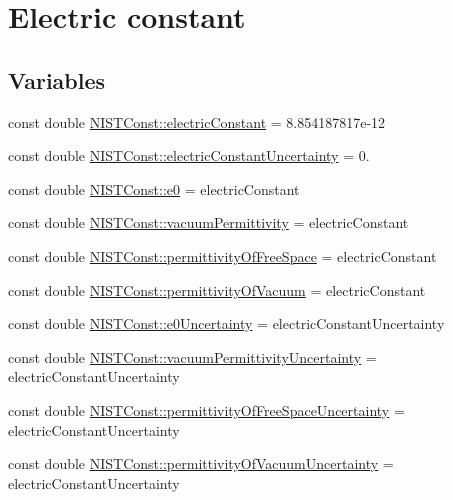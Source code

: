 \hypertarget{group___n_i_s_t_const-_electric_constant}{}\section{Electric constant}
\label{group___n_i_s_t_const-_electric_constant}
\subsection*{Variables}
\begin{DoxyCompactItemize}
\item 
const double \hyperlink{group___n_i_s_t_const-_electric_constant_gae5a425228125285727dd53333725ef76}{N\+I\+S\+T\+Const\+::electric\+Constant} = 8.\+854187817e-\/12
\item 
const double \hyperlink{group___n_i_s_t_const-_electric_constant_gaf65e89a9fe674a6f80f5a66bbe101aab}{N\+I\+S\+T\+Const\+::electric\+Constant\+Uncertainty} = 0.
\item 
const double \hyperlink{group___n_i_s_t_const-_electric_constant_ga6fa2aaf171b8dafe96bbd87c7aa95f59}{N\+I\+S\+T\+Const\+::e0} = electric\+Constant
\item 
const double \hyperlink{group___n_i_s_t_const-_electric_constant_ga46294f940b4149602e7bef336431c7dd}{N\+I\+S\+T\+Const\+::vacuum\+Permittivity} = electric\+Constant
\item 
const double \hyperlink{group___n_i_s_t_const-_electric_constant_ga56d0b5b81201a3a81b724d45a4a73b81}{N\+I\+S\+T\+Const\+::permittivity\+Of\+Free\+Space} = electric\+Constant
\item 
const double \hyperlink{group___n_i_s_t_const-_electric_constant_ga81378e87b977f5b3403002e187d3d22c}{N\+I\+S\+T\+Const\+::permittivity\+Of\+Vacuum} = electric\+Constant
\item 
const double \hyperlink{group___n_i_s_t_const-_electric_constant_ga35084e49b0f999bcafda4ae95038913c}{N\+I\+S\+T\+Const\+::e0\+Uncertainty} = electric\+Constant\+Uncertainty
\item 
const double \hyperlink{group___n_i_s_t_const-_electric_constant_gac4df73e5c5ea0e0829f575ff1c2cc793}{N\+I\+S\+T\+Const\+::vacuum\+Permittivity\+Uncertainty} = electric\+Constant\+Uncertainty
\item 
const double \hyperlink{group___n_i_s_t_const-_electric_constant_gad3837c8ac9496d07b2a4c9da66b19e4a}{N\+I\+S\+T\+Const\+::permittivity\+Of\+Free\+Space\+Uncertainty} = electric\+Constant\+Uncertainty
\item 
const double \hyperlink{group___n_i_s_t_const-_electric_constant_ga4f15fd528291e6284d5fc3ad58c5a97a}{N\+I\+S\+T\+Const\+::permittivity\+Of\+Vacuum\+Uncertainty} = electric\+Constant\+Uncertainty
\end{DoxyCompactItemize}


